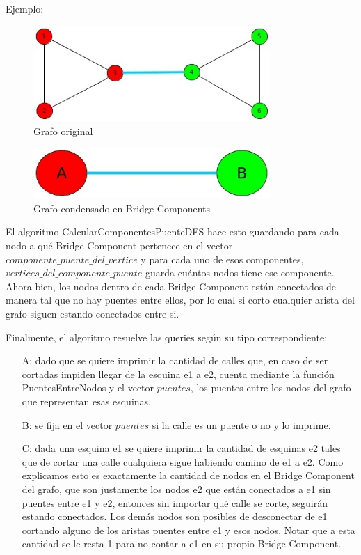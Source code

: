 Ejemplo:\\
\begin{figure}[H]
\centering
\includegraphics[width=90mm]{./img/bridge_comp_1.jpeg}
\caption{Grafo original}
\end{figure}
\begin{figure}[H]
\centering
\includegraphics[width=90mm]{./img/bridge_comp_2.jpeg}
\caption{Grafo condensado en Bridge Components}
\end{figure}

El algoritmo CalcularComponentesPuenteDFS hace esto guardando para cada nodo 
a qué Bridge Component pertenece en el vector $componente\_puente\_del\_vertice$ y para cada uno de esos componentes, 
$vertices\_del\_componente\_puente$ guarda cuántos nodos tiene ese componente. \\
Ahora bien, los nodos dentro de cada Bridge Component están conectados de manera tal que no hay puentes entre ellos,
por lo cual si corto cualquier arista del grafo siguen estando conectados entre si.

Finalmente, el algoritmo resuelve las queries según su tipo correspondiente:
\begin{itemize}
	\item[A: ] dado que se quiere imprimir la cantidad de calles que, en caso de ser cortadas impiden llegar de la 
	esquina e1 a e2, cuenta mediante la función PuentesEntreNodos y el vector $puentes$, los puentes entre los nodos 
	del grafo que representan esas esquinas.
	\item[B: ] se fija en el vector $puentes$ si la calle es un puente o no y lo imprime.
	\item[C: ] dada una esquina e1 se quiere imprimir la cantidad de esquinas e2 tales que de cortar una calle cualquiera 
	sigue habiendo camino de e1 a e2. Como explicamos esto es exactamente la cantidad de nodos en el Bridge Component del
	grafo, que son justamente los nodos e2 que están conectados a e1 sin puentes entre e1 y e2, entonces sin importar
	qué calle se corte, seguirán estando conectados. Los demás nodos son posibles de desconectar de e1 cortando alguno
	de los aristas puentes entre e1 y esos nodos. Notar que a esta cantidad se le resta 1 para no contar a e1 en su 
	propio Bridge Component.
\end{itemize}

